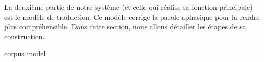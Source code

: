 \section{}

La deuxième partie de notre système (et celle qui réalise sa fonction principale) est le modèle de traduction.
Ce modèle corrige la parole aphasique pour la rendre plus compréhensible.
Dans cette section, nous allons détailler les étapes de sa construction.

{corpus}
{model}